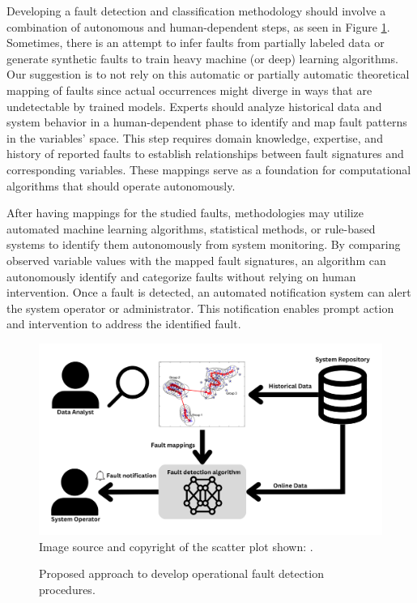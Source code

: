Developing a fault detection and classification methodology should involve a combination of autonomous and human-dependent steps, as seen in Figure \ref{fig:approach_fault_detection}. Sometimes, there is an attempt to infer faults from partially labeled data or generate synthetic faults to train heavy machine (or deep) learning algorithms. Our suggestion is to not rely on this automatic or partially automatic theoretical mapping of faults since actual occurrences might diverge in ways that are undetectable by trained models.
Experts should analyze historical data and system behavior in a human-dependent phase to identify and map fault patterns in the variables' space. This step requires domain knowledge, expertise, and history of reported faults to establish relationships between fault signatures and corresponding variables. These mappings serve as a foundation for computational algorithms that should operate autonomously.

After having mappings for the studied faults, methodologies may utilize automated machine learning algorithms, statistical methods, or rule-based systems to identify them autonomously from system monitoring. By comparing observed variable values with the mapped fault signatures, an algorithm can autonomously identify and categorize faults without relying on human intervention.
Once a fault is detected, an automated notification system can alert the system operator or administrator. This notification enables prompt action and intervention to address the identified fault.

\begin{figure}[h!]
    \centering
    \includegraphics[width=\textwidth]{figures/chapter5/algorithm/approach_fault_detection.png}
    Image source and copyright of the scatter plot shown: \cite{Kumpulainen2007}.
    \caption{Proposed approach to develop operational fault detection procedures.}
    \label{fig:approach_fault_detection}
\end{figure}

